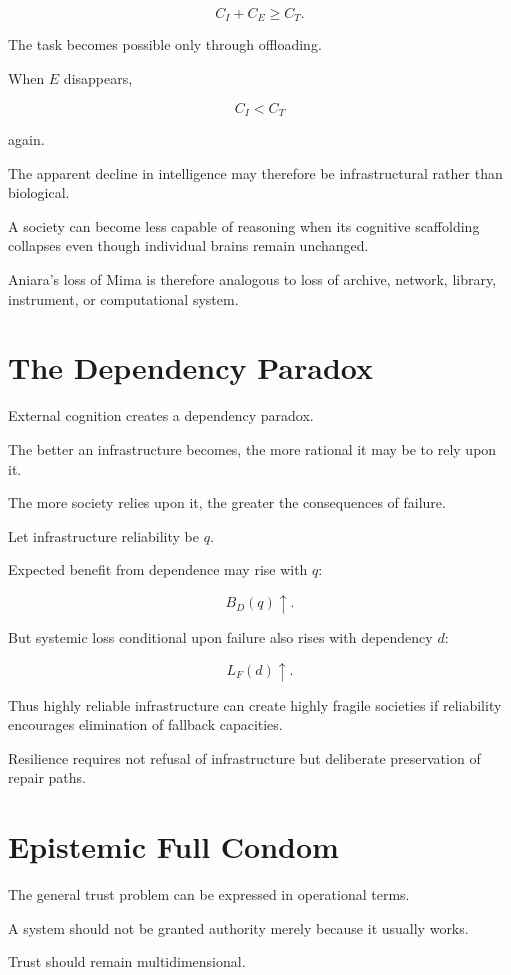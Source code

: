 \documentclass[11pt,oneside]{book}
\theoremstyle{definition}
\theoremstyle{remark}
\begin{document}
\[
C_I+C_E\geq C_T.
\]

The task becomes possible only through offloading.

When \(E\) disappears,

\[
C_I<C_T
\]

again.

The apparent decline in intelligence may therefore be infrastructural rather than biological.

A society can become less capable of reasoning when its cognitive scaffolding collapses even though individual brains remain unchanged.

Aniara's loss of Mima is therefore analogous to loss of archive, network, library, instrument, or computational system.

\section{The Dependency Paradox}

External cognition creates a dependency paradox.

The better an infrastructure becomes, the more rational it may be to rely upon it.

The more society relies upon it, the greater the consequences of failure.

Let infrastructure reliability be \(q\).

Expected benefit from dependence may rise with \(q\):

\[
B_D(q)\uparrow.
\]

But systemic loss conditional upon failure also rises with dependency \(d\):

\[
L_F(d)\uparrow.
\]

Thus highly reliable infrastructure can create highly fragile societies if reliability encourages elimination of fallback capacities.

Resilience requires not refusal of infrastructure but deliberate preservation of repair paths.

\section{Epistemic Full Condom}

The general trust problem can be expressed in operational terms.

A system should not be granted authority merely because it usually works.

Trust should remain multidimensional.
\end{document}
